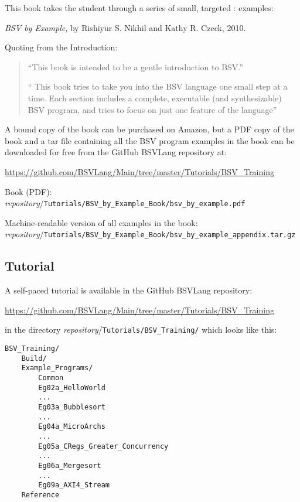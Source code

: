 This book takes the student through a series of small, targeted {\BSV}:
examples:

\hm \emph{BSV by Example}, by Rishiyur S. Nikhil and Kathy R. Czeck, 2010.

Quoting from the Introduction:
\begin{quote}
``This book is intended to be a gentle introduction to BSV.''

`` This book tries to take you into the BSV language one small step at
a time. Each section includes a complete, executable (and
synthesizable) BSV program, and tries to focus on just one feature of
the language''
\end{quote}

A bound copy of the book can be purchased on Amazon, but a PDF copy of
the book and a tar file containing all the BSV program examples in the
book can be downloaded for free from the GitHub BSVLang repository at:

\url{https://github.com/BSVLang/Main/tree/master/Tutorials/BSV_Training}

\begin{tightlist}
  \item Book (PDF): \\
  \emph{repository}/\verb|Tutorials/BSV_by_Example_Book/bsv_by_example.pdf|

  \item Machine-readable version of all examples in the book: \\
  \emph{repository}/\verb|Tutorials/BSV_by_Example_Book/bsv_by_example_appendix.tar.gz|
\end{tightlist}


\subsection{{\BSV} Tutorial}

A {\BSV} self-paced tutorial is available in the GitHub BSVLang repository:

\url{https://github.com/BSVLang/Main/tree/master/Tutorials/BSV_Training}

in the directory   \emph{repository}/\verb|Tutorials/BSV_Training/| which looks like this:

\begin{Verbatim}[frame=single]
BSV_Training/
    Build/
    Example_Programs/
        Common
        Eg02a_HelloWorld
        ...
        Eg03a_Bubblesort
        ...
        Eg04a_MicroArchs
        ...
        Eg05a_CRegs_Greater_Concurrency
        ...
        Eg06a_Mergesort
        ...
        Eg09a_AXI4_Stream
    Reference
\end{Verbatim}

